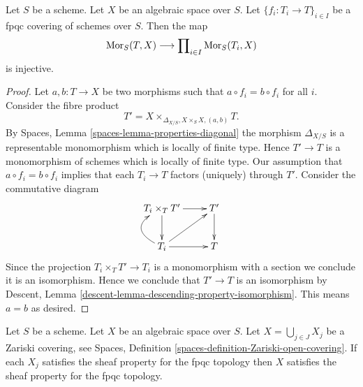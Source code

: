 \begin{lemma}
\label{lemma-separated-fpqc}
Let $S$ be a scheme.
Let $X$ be an algebraic space over $S$.
Let $\{f_i : T_i \to T\}_{i \in I}$ be a fpqc covering of schemes over $S$.
Then the map
$$
\mathop{\rm Mor}\nolimits_S(T, X)
\longrightarrow
\prod\nolimits_{i \in I} \mathop{\rm Mor}\nolimits_S(T_i, X)
$$
is injective.
\end{lemma}

\begin{proof}
Let $a, b : T \to X$ be two morphisms such that $a \circ f_i = b \circ f_i$
for all $i$. Consider the fibre product
$$
T' = X \times_{\Delta_{X/S}, X \times_S X, (a, b)} T.
$$
By
Spaces, Lemma \ref{spaces-lemma-properties-diagonal}
the morphism $\Delta_{X/S}$ is a representable monomorphism which is
locally of finite type. Hence $T' \to T$ is a monomorphism of schemes which
is locally of finite type. Our assumption that $a \circ f_i = b \circ f_i$
implies that each $T_i \to T$ factors (uniquely) through $T'$. Consider
the commutative diagram
$$
\xymatrix{
T_i \times_T T' \ar[r] \ar[d] & T' \ar[d] \\
T_i \ar[r] \ar@/^5ex/[u] \ar[ru] & T
}
$$
Since the projection $T_i \times_T T' \to T_i$ is a monomorphism
with a section we conclude it is an isomorphism. Hence we conclude that
$T' \to T$ is an isomorphism by
Descent, Lemma \ref{descent-lemma-descending-property-isomorphism}.
This means $a = b$ as desired.
\end{proof}

\begin{lemma}
\label{lemma-sheaf-fpqc-open-covering}
Let $S$ be a scheme.
Let $X$ be an algebraic space over $S$.
Let $X = \bigcup_{j \in J} X_j$ be a Zariski covering, see
Spaces, Definition \ref{spaces-definition-Zariski-open-covering}.
If each $X_j$ satisfies the sheaf property for the fpqc topology
then $X$ satisfies the sheaf property for the fpqc topology.
\end{lemma}

